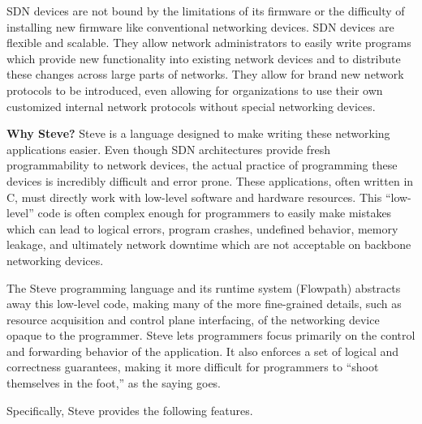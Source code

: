SDN devices are not bound by the limitations of its firmware or the difficulty of installing new firmware like conventional networking devices. SDN devices are flexible and scalable. They allow network administrators to easily write programs which provide new functionality into existing network devices and to distribute these changes across large parts of networks. They allow for brand new network protocols to be introduced, even allowing for organizations to use their own customized internal network protocols without special networking devices.

\textbf{Why Steve?} Steve is a language designed to make writing these networking applications easier. Even though SDN architectures provide fresh programmability to network devices, the actual practice of programming these devices is incredibly difficult and error prone. These applications, often written in C, must directly work with low-level software and hardware resources. This “low-level” code is often complex enough for programmers to easily make mistakes which can lead to logical errors, program crashes, undefined behavior, memory leakage, and ultimately network downtime which are not acceptable on backbone networking devices.

The Steve programming language and its runtime system (Flowpath) abstracts away this low-level code, making many of the more fine-grained details, such as resource acquisition and control plane interfacing, of the networking device opaque to the programmer. Steve lets programmers focus primarily on the control and forwarding behavior of the application. It also enforces a set of logical and correctness guarantees, making it more difficult for programmers to “shoot themselves in the foot,” as the saying goes.

Specifically, Steve provides the following features.

